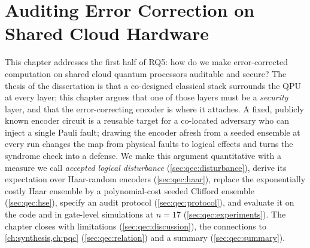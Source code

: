 \chapter{Auditing Error Correction on Shared Cloud Hardware}\label{ch:qec}


This chapter addresses the first half of RQ5: how do we make error-corrected computation on shared cloud quantum processors auditable and secure? The thesis of the dissertation is that a co-designed classical stack surrounds the QPU at every layer; this chapter argues that one of those layers must be a \emph{security} layer, and that the error-correcting encoder is where it attaches. A fixed, publicly known encoder circuit is a reusable target for a co-located adversary who can inject a single Pauli fault; drawing the encoder afresh from a seeded ensemble at every run changes the map from physical faults to logical effects and turns the syndrome check into a defense. We make this argument quantitative with a measure we call \emph{accepted logical disturbance} (\cref{sec:qec:disturbance}), derive its expectation over Haar-random encoders (\cref{sec:qec:haar}), replace the exponentially costly Haar ensemble by a polynomial-cost seeded Clifford ensemble (\cref{sec:qec:hse}), specify an audit protocol (\cref{sec:qec:protocol}), and evaluate it on the  code and in gate-level simulations at $n=17$ (\cref{sec:qec:experiments}). The chapter closes with limitations (\cref{sec:qec:discussion}), the connections to \cref{ch:synthesis,ch:pqc} (\cref{sec:qec:relation}) and a summary (\cref{sec:qec:summary}).

